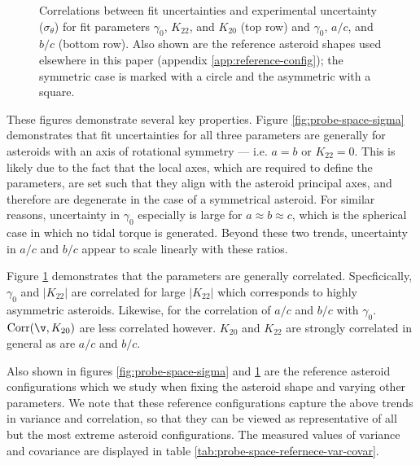 \documentclass{aastex631}
\begin{document}
\begin{figure}
  \caption{Correlations between fit uncertainties and experimental uncertainty ($\sigma_\theta$) for fit parameters $\gamma_0$, $K_{22}$, and $K_{20}$ (top row) and $\gamma_0$, $a/c$, and $b/c$ (bottom row). Also shown are the reference asteroid shapes used elsewhere in this paper (appendix \ref{app:reference-config}); the symmetric case is marked with a circle and the asymmetric with a square.}
  \label{fig:probe-space-corr}
\end{figure}

These figures demonstrate several key properties. Figure \ref{fig:probe-space-sigma} demonstrates that fit uncertainties for all three parameters are generally for asteroids with an axis of rotational symmetry --- i.e. $a=b$ or $K_{22} = 0$. This is likely due to the fact that the local axes, which are required to define the parameters, are set such that they align with the asteroid principal axes, and therefore are degenerate in the case of a symmetrical asteroid. For similar reasons, uncertainty in $\gamma_0$ especially is large for $a \approx b \approx c$, which is the spherical case in which no tidal torque is generated. Beyond these two trends, uncertainty in $a/c$ and $b/c$ appear to scale linearly with these ratios. 

Figure \ref{fig:probe-space-corr} demonstrates that the parameters are generally correlated. Specficically, $\gamma_0$ and $|K_{22}|$ are correlated for large $|K_{22}|$ which corresponds to highly asymmetric asteroids. Likewise, for the correlation of $a/c$ and $b/c$ with $\gamma_0$. $\mathrm{Corr}(\v, K_{20})$ are less correlated however. $K_{20}$ and $K_{22}$ are strongly correlated in general as are $a/c$ and $b/c$.

Also shown in figures \ref{fig:probe-space-sigma} and \ref{fig:probe-space-corr} are the reference asteroid configurations which we study when fixing the asteroid shape and varying other parameters. We note that these reference configurations capture the above trends in variance and correlation, so that they can be viewed as representative of all but the most extreme asteroid configurations. The measured values of variance and covariance are displayed in table \ref{tab:probe-space-refernece-var-covar}.
\end{document}
